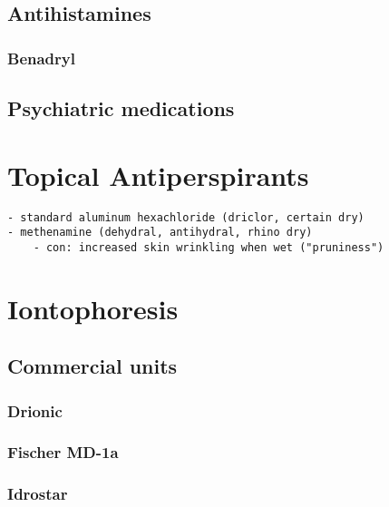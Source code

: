 \documentclass[]{book}
\begin{document}
\hypertarget{antihistamines}{%
\section{Antihistamines}\label{antihistamines}}

\hypertarget{benadryl}{%
\subsection{Benadryl}\label{benadryl}}

\hypertarget{psychiatric-medications}{%
\section{Psychiatric medications}\label{psychiatric-medications}}

\hypertarget{topical}{%
\chapter{Topical Antiperspirants}\label{topical}}

\begin{verbatim}
- standard aluminum hexachloride (driclor, certain dry)
- methenamine (dehydral, antihydral, rhino dry)
    - con: increased skin wrinkling when wet ("pruniness") 
\end{verbatim}

\hypertarget{ionto}{%
\chapter{Iontophoresis}\label{ionto}}

\hypertarget{commercial-units}{%
\section{Commercial units}\label{commercial-units}}

\hypertarget{drionic}{%
\subsection{Drionic}\label{drionic}}

\hypertarget{fischer-md-1a}{%
\subsection{Fischer MD-1a}\label{fischer-md-1a}}

\hypertarget{idrostar}{%
\subsection{Idrostar}\label{idrostar}}
\end{document}
